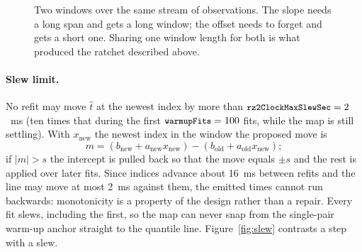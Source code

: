 \documentclass[11pt,a4paper]{article}
\newcommand{\code}[1]{\texttt{\small #1}}
\begin{document}
\begin{figure}[htbp]
\centering
{}
\caption{Two windows over the same stream of observations. The slope needs a
long span and gets a long window; the offset needs to forget and gets a short
one. Sharing one window length for both is what produced the ratchet described
above.}
\label{fig:twowindows}
\end{figure}

\paragraph{Slew limit.} No refit may move $\hat t$ at the newest index by more
than $\code{rz2ClockMaxSlewSec} = 2$~ms (ten times that during the first
$\code{warmupFits} = 100$ fits, while the map is still settling). With
$x_{\text{new}}$ the newest index in the window the proposed move is
\[
  m = (b_{\text{new}} + a_{\text{new}} x_{\text{new}})
    - (b_{\text{old}} + a_{\text{old}} x_{\text{new}});
\]
if $|m| > s$ the intercept is pulled back so that the move equals $\pm s$ and
the rest is applied over later fits. Since indices advance about 16~ms between
refits and the line may move at most 2~ms against them, the emitted times
cannot run backwards: monotonicity is a property of the design rather than a
repair. Every fit slews, including the first, so the map can never snap from
the single-pair warm-up anchor straight to the quantile line.
Figure~\ref{fig:slew} contrasts a step with a slew.
\end{document}
